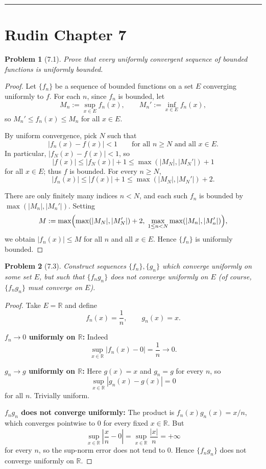 \documentclass[12 pt]{article}
\newtheorem{prob}{Problem}
\begin{document}
\vspace{1em}
\hrule
\vspace{1em}

\section*{Rudin Chapter 7}

\begin{prob}[7.1]
Prove that every uniformly convergent sequence of bounded functions is uniformly bounded.
\end{prob}
\begin{proof}
Let $\{f_n\}$ be a sequence of bounded functions on a set $E$ converging uniformly to $f$. For each $n$, since $f_n$ is bounded, let
$$
M_n := \sup_{x \in E} f_n(x), \qquad M_n' := \inf_{x \in E} f_n(x),
$$
so $M_n' \leq f_n(x) \leq M_n$ for all $x \in E$.

By uniform convergence, pick $N$ such that
$$
|f_n(x) - f(x)| < 1 \qquad \text{for all } n \geq N \text{ and all } x \in E.
$$
In particular, $|f_N(x) - f(x)| < 1$, so
$$
|f(x)| \leq |f_N(x)| + 1 \leq \max(|M_N|, |M_N'|) + 1
$$
for all $x \in E$; thus $f$ is bounded. For every $n \geq N$,
$$
|f_n(x)| \leq |f(x)| + 1 \leq \max(|M_N|, |M_N'|) + 2.
$$

There are only finitely many indices $n < N$, and each such $f_n$ is bounded by $\max(|M_n|, |M_n'|)$. Setting
$$
M := \max\Bigl( \max(|M_N|, |M_N'|) + 2,\; \max_{1 \leq n < N} \max(|M_n|, |M_n'|) \Bigr),
$$
we obtain $|f_n(x)| \leq M$ for all $n$ and all $x \in E$. Hence $\{f_n\}$ is uniformly bounded.
\end{proof}

\begin{prob}[7.3]
Construct sequences $\{f_{n}\}, \{g_{n}\}$ which converge uniformly on some set $E$, but such that $\{f_{n} g_{n}\}$ does not converge uniformly on $E$ (of course, $\{f_{n} g_{n}\}$ must converge on $E$).
\end{prob}
\begin{proof}
Take $E = \mathbb{R}$ and define
$$
f_n(x) = \frac{1}{n}, \qquad g_n(x) = x.
$$

\textbf{$f_n \to 0$ uniformly on $\mathbb{R}$:} Indeed
$$
\sup_{x \in \mathbb{R}} |f_n(x) - 0| = \frac{1}{n} \to 0.
$$

\textbf{$g_n \to g$ uniformly on $\mathbb{R}$:} Here $g(x) = x$ and $g_n = g$ for every $n$, so
$$
\sup_{x \in \mathbb{R}} |g_n(x) - g(x)| = 0
$$
for all $n$. Trivially uniform.

\textbf{$f_n g_n$ does not converge uniformly:} The product is $f_n(x) g_n(x) = x/n$, which converges pointwise to $0$ for every fixed $x \in \mathbb{R}$. But
$$
\sup_{x \in \mathbb{R}} \left| \frac{x}{n} - 0 \right| = \sup_{x \in \mathbb{R}} \frac{|x|}{n} = +\infty
$$
for every $n$, so the sup-norm error does not tend to $0$. Hence $\{f_n g_n\}$ does not converge uniformly on $\mathbb{R}$.
\end{proof}
\end{document}
